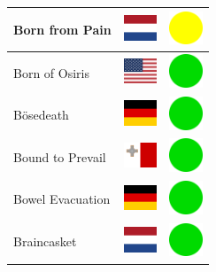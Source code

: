 \documentclass[12pt, a4paper, twoside]{report}
\begin{document}
\begin{center}
\begin{longtable}{|p{5cm}|p{2cm}|p{2cm}|}
 Born from Pain                                             & \includegraphics[width=1cm]{../4x3/nl} &   \includegraphics[width=1cm]{../likes/m} \\ \hline
 Born of Osiris                                             & \includegraphics[width=1cm]{../4x3/us} &   \includegraphics[width=1cm]{../likes/y} \\ \hline
 Bösedeath                                                  & \includegraphics[width=1cm]{../4x3/de} &   \includegraphics[width=1cm]{../likes/y} \\ \hline
 Bound to Prevail                                           & \includegraphics[width=1cm]{../4x3/mt} &   \includegraphics[width=1cm]{../likes/y} \\ \hline
 Bowel Evacuation                                           & \includegraphics[width=1cm]{../4x3/de} &   \includegraphics[width=1cm]{../likes/y} \\ \hline
 Braincasket                                                & \includegraphics[width=1cm]{../4x3/nl} &   \includegraphics[width=1cm]{../likes/y} \\ \hline

\end{longtable}
\end{center}
\end{document}
